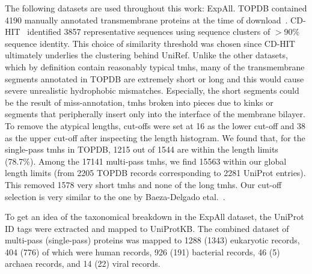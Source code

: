 The following datasets are used throughout this work:
ExpAll. TOPDB contained 4190 manually annotated transmembrane proteins at the time of download~\cite{Dobson2015}. CD-HIT~\cite{Huang2010} identified 3857 representative sequences using sequence clusters of $>$90\% sequence identity. This choice of similarity threshold was chosen since CD-HIT ultimately underlies the clustering behind UniRef. Unlike the other datasets, which by definition contain reasonably typical \gls{tmh}s, many of the transmembrane segments annotated in TOPDB are extremely short or long and this would cause severe unrealistic hydrophobic mismatches. Especially, the short segments could be the result of miss-annotation, \gls{tmh}s broken into pieces due to kinks or segments that peripherally insert only into the interface of the membrane bilayer. To remove the atypical lengths, cut-offs were set at 16 as the lower cut-off and 38 as the upper cut-off after inspecting the length histogram. We found that, for the single-pass \gls{tmh}s in TOPDB, 1215 out of 1544 are within the length limits (78.7\%). Among the 17141 multi-pass \gls{tmh}s, we find 15563 within our global length limits (from 2205 TOPDB records corresponding to 2281 UniProt entries). This removed 1578 very short \gls{tmh}s and none of the long \gls{tmh}s. Our cut-off selection is very similar to the one by Baeza-Delgado etal.~\cite{Baeza-Delgado2013}.

To get an idea of the taxonomical breakdown in the ExpAll dataset, the UniProt ID tags were extracted and mapped to UniProtKB. The combined dataset of multi-pass (single-pass) proteins was mapped to 1288 (1343) eukaryotic records, 404 (776) of which were human records, 926 (191) bacterial records, 46 (5) archaea records, and 14 (22) viral records.

